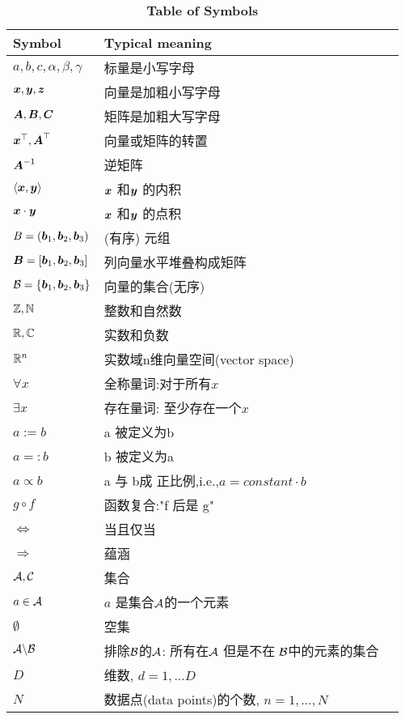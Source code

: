 \renewcommand\arraystretch{0.8}
\begin{table}
\caption*{\textbf{Table of Symbols}}
\begin{tabular}{llp{\textwidth}}
    \hline
    Symbol & Typical meaning \\
    \hline
    \hline
    $a, b, c, \alpha, \beta, \gamma$ & 标量是小写字母 \\
    $\boldsymbol{x}, \boldsymbol{y}, \boldsymbol{z}$ & 向量是加粗小写字母 \\
    $\boldsymbol{A}, \boldsymbol{B}, \boldsymbol{C}$ & 矩阵是加粗大写字母 \\
    $\boldsymbol{x}^\top, \boldsymbol{A}^\top$  & 向量或矩阵的转置 \\
    $\boldsymbol{A}^{-1}$ & 逆矩阵 \\
    $\langle \boldsymbol{x}, \boldsymbol{y} \rangle$ & $\boldsymbol{x}$ 和$\boldsymbol{y}$ 的内积 \\
    $\boldsymbol{x} \cdot \boldsymbol{y}$ & $\boldsymbol{x}$ 和$\boldsymbol{y}$ 的点积 \\
    $B=(\boldsymbol{b}_1, \boldsymbol{b}_2, \boldsymbol{b}_3)$ & (有序) 元组 \\
    $\boldsymbol{B}=[\boldsymbol{b}_1, \boldsymbol{b}_2, \boldsymbol{b}_3]$ & 列向量水平堆叠构成矩阵 \\
    $\mathcal{B} = \{\boldsymbol{b}_1, \boldsymbol{b}_2, \boldsymbol{b}_3 \}$ & 向量的集合(无序) \\
    $\mathbb{Z}, \mathbb{N}$ & 整数和自然数 \\
    $\mathbb{R}, \mathbb{C}$ & 实数和负数 \\
    $\mathbb{R}^n$ & 实数域n维向量空间(vector space) \\
    \hline
    $\forall x$ & 全称量词:对于所有$x$ \\
    $\exists x$ & 存在量词: 至少存在一个$x$ \\
    $a:=b$ & a 被定义为b \\
    $a=:b$ & b 被定义为a \\
    $a \propto b$ & a 与 b成 正比例,i.e.,$a = constant \cdot b$\\
    $g \circ f$ & 函数复合:"f 后是 g" \\
    $\Longleftrightarrow$ & 当且仅当 \\
    $\Longrightarrow$ & 蕴涵 \\
    $\mathcal{A}, \mathcal{C}$ & 集合 \\
    $a \in \mathcal{A}$ & $a$ 是集合$\mathcal{A}$的一个元素 \\
    $\emptyset$ & 空集 \\
    $\mathcal{A} \backslash \mathcal{B}$ & 排除$\mathcal{B}$的$\mathcal{A}$:
            所有在$\mathcal{A}$ 但是不在 $\mathcal{B}$中的元素的集合 \\
    $D$ & 维数, $d = 1, ... D$ \\
    $N$ & 数据点(data points)的个数, $n = 1,..., N$ \\

\end{tabular}
\end{table}
